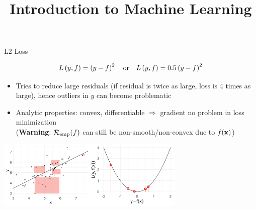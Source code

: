\documentclass[11pt,compress,t,notes=noshow, xcolor=table]{beamer}
\title{Introduction to Machine Learning}
\institute{\href{https://compstat-lmu.github.io/lecture_i2ml/}{compstat-lmu.github.io/lecture\_i2ml}}
\date{}
\begin{document}

\begin{vbframe}{L2-Loss}

\vspace*{-0.5cm}

$$
L\left(y, f\right) = \left(y-f\right)^2 \quad \text{or} \quad L\left(y, f\right) = 0.5 \left(y-f\right)^2
$$

\vspace*{-2mm}

\begin{itemize}
\item Tries to reduce large residuals (if residual is twice as large, loss is 4 times as large), hence outliers in $y$ can become problematic
\item Analytic properties: convex, differentiable $\Rightarrow$ gradient no problem in loss minimization\\ {\small (\textbf{Warning}: $\mathcal{R}_{\text{emp}}(f)$ can still be non-smooth/non-convex due to $f(\mathbf{x})$)}
\end{itemize}






\begin{center}
  \includegraphics[width = 9cm]{figure/loss_quadratic_2.png} \\
\end{center}

\end{vbframe}
\end{document}
